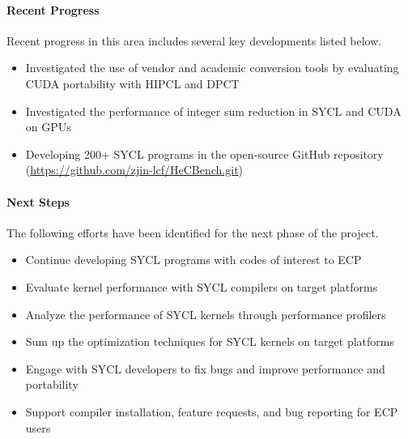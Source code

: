 \paragraph{Recent Progress}
Recent progress in this area includes several key developments listed below.
\begin{itemize}
\item Investigated the use of vendor and academic conversion tools by evaluating CUDA portability with HIPCL and DPCT \cite{dpct}
\item Investigated the performance of integer sum reduction in SYCL and CUDA on GPUs \cite{reduction}
\item Developing 200+ SYCL programs in the open-source GitHub repository (\url{https://github.com/zjin-lcf/HeCBench.git})
\end{itemize}


\paragraph{Next Steps}
The following efforts have been identified for the next phase of the project.
\begin{itemize}
\item Continue developing SYCL programs with codes of interest to ECP
\item Evaluate kernel performance with SYCL compilers on target platforms
\item Analyze the performance of SYCL kernels through performance profilers
\item Sum up the optimization techniques for SYCL kernels on target platforms
\item Engage with SYCL developers to fix bugs and improve performance and portability
\item Support compiler installation, feature requests, and bug reporting for ECP users
\end{itemize}

